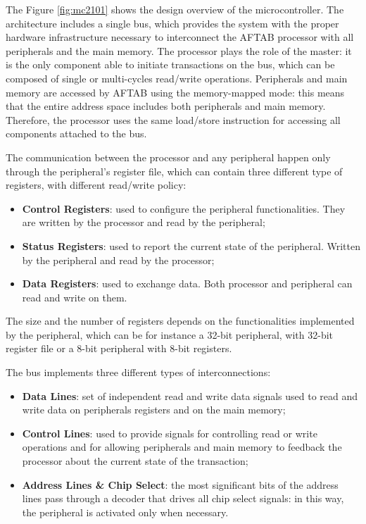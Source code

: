 The Figure \ref{fig:mc2101}  shows the design overview of the microcontroller. The architecture includes a single bus, which provides the system with the proper hardware infrastructure necessary to interconnect the AFTAB processor with all peripherals and the main memory. The processor plays the role of the master: it is the only component able to initiate transactions on the bus, which can be composed of single or multi-cycles read/write operations. Peripherals and main memory are accessed by AFTAB using the memory-mapped mode: this means that the entire address space includes both peripherals and main memory. Therefore, the processor uses the same load/store instruction for accessing all components attached to the bus.

The communication between the processor and any peripheral happen only through the peripheral's register file, which can contain three different type of registers, with different read/write policy:

\begin{itemize}
\item \textbf{Control Registers}: used to configure the peripheral functionalities. They are written by the processor and read by the peripheral;
\item \textbf{Status Registers}: used to report the current state of the peripheral. Written by the peripheral and read by the processor;
\item \textbf{Data Registers}: used to exchange data. Both processor and peripheral can read and write on them.
\end{itemize}

The size and the number of registers depends on the functionalities implemented by the peripheral, which can be for instance a 32-bit peripheral, with 32-bit register file or a 8-bit peripheral with 8-bit registers. 

The bus implements three different types of interconnections:

\begin{itemize}
\item \textbf{Data Lines}: set of independent read and write data signals used to read and write data on peripherals registers and on the main memory;
\item \textbf{Control Lines}: used to provide signals for controlling read or write operations and for allowing peripherals and main memory to feedback the processor about the current state of the transaction;
\item \textbf{Address Lines \& Chip Select}: the most significant bits of the address lines pass through a decoder that drives all chip select signals: in this way, the peripheral is activated only when necessary.
\end{itemize}

